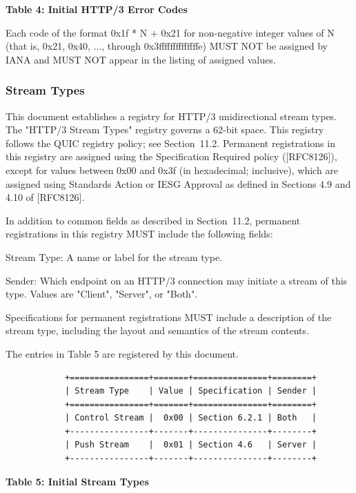 \documentclass{article}
\begin{document}
\begin{center}
\textbf{Table 4: Initial HTTP/3 Error Codes}
\end{center}

Each code of the format 0x1f * N + 0x21 for non-negative integer values of N (that is, 0x21, 0x40, ..., through 0x3ffffffffffffffe) MUST NOT be assigned by IANA and MUST NOT appear in the listing of assigned values.

\subsubsection{Stream Types}

This document establishes a registry for HTTP/3 unidirectional stream types.  The "HTTP/3 Stream Types" registry governs a 62-bit space. This registry follows the QUIC registry policy; see Section~11.2. Permanent registrations in this registry are assigned using the Specification Required policy ([RFC8126]), except for values between 0x00 and 0x3f (in hexadecimal; inclusive), which are assigned using Standards Action or IESG Approval as defined in Sections 4.9 and 4.10 of [RFC8126].

In addition to common fields as described in Section~11.2, permanent registrations in this registry MUST include the following fields:

Stream Type:  A name or label for the stream type.

Sender:  Which endpoint on an HTTP/3 connection may initiate a stream of this type.  Values are "Client", "Server", or "Both".

Specifications for permanent registrations MUST include a description of the stream type, including the layout and semantics of the stream contents.

The entries in Table 5 are registered by this document.

\begin{verbatim}
            +================+=======+===============+========+
            | Stream Type    | Value | Specification | Sender |
            +================+=======+===============+========+
            | Control Stream |  0x00 | Section 6.2.1 | Both   |
            +----------------+-------+---------------+--------+
            | Push Stream    |  0x01 | Section 4.6   | Server |
            +----------------+-------+---------------+--------+
\end{verbatim}

\begin{center}
\textbf{Table 5: Initial Stream Types}
\end{center}
\end{document}
